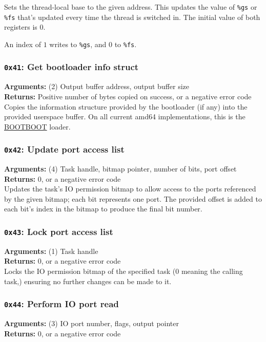 \documentclass[11pt]{article}
\begin{document}
Sets the thread-local base to the given address. This updates the value of \texttt{\%gs} or \texttt{\%fs} that's updated every time the thread is switched in. The initial value of both registers is 0.

An index of $1$ writes to \texttt{\%gs}, and $0$ to \texttt{\%fs}.

\subsubsection{{\tt 0x41}: Get bootloader info struct}
\textbf{Arguments:} (2) Output buffer address, output buffer size \\
\textbf{Returns:} Positive number of bytes copied on success, or a negative error code \\

Copies the information structure provided by the bootloader (if any) into the provided userspace buffer. On all current amd64 implementations, this is the \href{https://gitlab.com/bztsrc/bootboot/}{BOOTBOOT} loader.

\subsubsection{{\tt 0x42}: Update port access list}
\textbf{Arguments:} (4) Task handle, bitmap pointer, number of bits, port offset \\
\textbf{Returns:} 0, or a negative error code \\

Updates the task's IO permission bitmap to allow access to the ports referenced by the given bitmap; each bit represents one port. The provided offset is added to each bit's index in the bitmap to produce the final bit number.

\subsubsection{{\tt 0x43}: Lock port access list}
\textbf{Arguments:} (1) Task handle \\
\textbf{Returns:} 0, or a negative error code \\

Locks the IO permission bitmap of the specified task (0 meaning the calling task,) ensuring no further changes can be made to it.

\subsubsection{{\tt 0x44}: Perform IO port read}
\textbf{Arguments:} (3) IO port number, flags, output pointer \\
\textbf{Returns:} 0, or a negative error code \\
\end{document}
